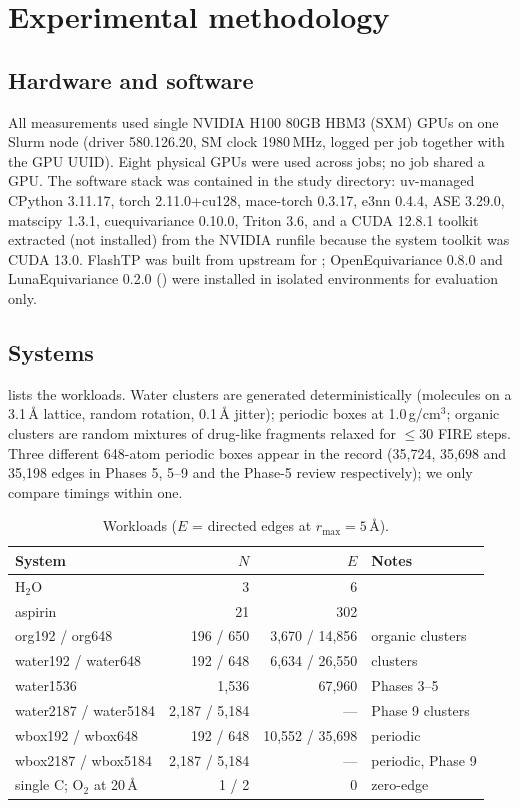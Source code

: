 \section{Experimental methodology}
\label{sec:method}

\subsection{Hardware and software}
All measurements used single NVIDIA H100 80GB HBM3 (SXM) GPUs on one Slurm node (driver 580.126.20, SM clock 1980\,MHz, logged per job together with the GPU UUID). Eight physical GPUs were used across jobs; no job shared a GPU. The software stack was contained in the study directory: uv-managed CPython 3.11.17, torch 2.11.0+cu128, mace-torch 0.3.17, e3nn 0.4.4, ASE 3.29.0, matscipy 1.3.1, cuequivariance 0.10.0, Triton 3.6, and a CUDA 12.8.1 toolkit extracted (not installed) from the NVIDIA runfile because the system toolkit was CUDA 13.0. FlashTP was built from upstream  for ; OpenEquivariance 0.8.0 and LunaEquivariance 0.2.0 () were installed in isolated environments for evaluation only.

\subsection{Systems}
 lists the workloads. Water clusters are generated deterministically (molecules on a 3.1\,\AA{} lattice, random rotation, 0.1\,\AA{} jitter); periodic boxes at 1.0\,g/cm$^3$; organic clusters are random mixtures of drug-like fragments relaxed for $\le$30 FIRE steps. Three different 648-atom periodic boxes appear in the record (35{,}724, 35{,}698 and 35{,}198 edges in Phases 5, 5--9 and the Phase-5 review respectively); we only compare timings within one.

\begin{table}[h]
\centering
\caption{Workloads ($E$ = directed edges at $r_{\max}=5$\,\AA).}
\label{tab:systems}
\small
\begin{tabular}{lrrl}
\toprule
System & $N$ & $E$ & Notes \\
\midrule
H$_2$O & 3 & 6 & \\
aspirin & 21 & 302 & \\
org192 / org648 & 196 / 650 & 3{,}670 / 14{,}856 & organic clusters \\
water192 / water648 & 192 / 648 & 6{,}634 / 26{,}550 & clusters \\
water1536 & 1{,}536 & 67{,}960 & Phases 3--5 \\
water2187 / water5184 & 2{,}187 / 5{,}184 & --- & Phase 9 clusters \\
wbox192 / wbox648 & 192 / 648 & 10{,}552 / 35{,}698 & periodic \\
wbox2187 / wbox5184 & 2{,}187 / 5{,}184 & --- & periodic, Phase 9 \\
single C; O$_2$ at 20\,\AA & 1 / 2 & 0 & zero-edge \\
\bottomrule
\end{tabular}
\end{table}

